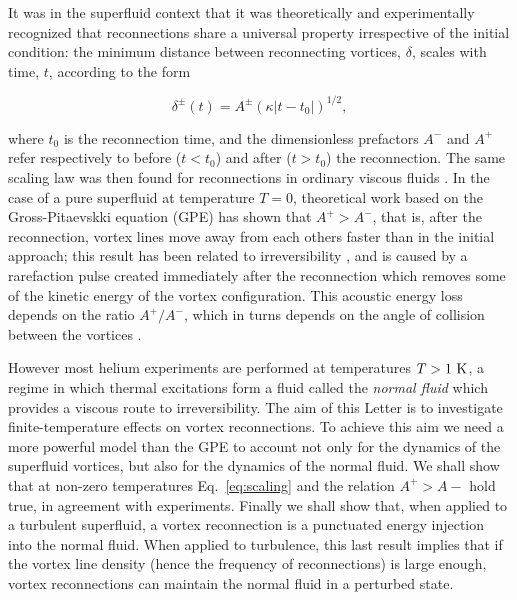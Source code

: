 \documentclass[%
 reprint,
 amsmath,amssymb,
 aps,
 prl,
]{revtex4-2}
\begin{document}
It was in the superfluid context that it was theoretically and
experimentally recognized
\cite{nazarenko2003,bewley2008,paoletti2010,zuccherQuantumVortexReconnections2012a,villoisUniversalNonuniversalAspects2017a,galantucciCrossoverInteractionDriven2019a}
that reconnections share a universal property irrespective of the initial
condition: the minimum distance between reconnecting 
vortices, $\delta$, scales with time, $t$, according to the form

\begin{equation}
\label{eq:scaling}
	\delta^{\pm}(t) = A^{\pm} (\kappa|t-t_0|)^{1/2},
\end{equation} 

\noindent
where $t_0$ is the reconnection time, and the dimensionless
prefactors $A^-$ and $A^+$ refer respectively to before
($t<t_0$) and after ($t>t_0$) the reconnection. The same scaling law
was then found for reconnections in ordinary viscous fluids 
\cite{yaoSeparationScalingViscous2020}. In the case of a pure
superfluid at temperature $T=0$, theoretical work based on
the Gross-Pitaevskki equation (GPE) has shown that
$A^+>A^-$, that is, after the reconnection, vortex lines move away from 
each others faster than in the initial approach; this result has been
related to irreversibility \cite{villoisIrreversibleDynamicsVortex2020},
and is caused by a rarefaction pulse created immediately after the reconnection\cite{leadbeaterSoundEmissionDue2001b,zuccherQuantumVortexReconnections2012a} which
removes some of the kinetic energy of the vortex configuration.
This acoustic energy loss depends on
the ratio $A^+/A^-$, which in turns depends on the angle of collision
between the vortices \cite{villoisIrreversibleDynamicsVortex2020}. 

However most helium experiments
are performed at temperatures $T>1~\rm K$, a regime in which thermal 
excitations form a fluid called the {\it normal fluid} which provides a viscous
route to irreversibility. The aim of this Letter is to investigate
finite-temperature effects on vortex reconnections. 
To achieve this aim we need a more powerful
model than the GPE to account not only for the dynamics of the
superfluid vortices, but also for the dynamics of the normal fluid.
We shall show that at non-zero temperatures Eq.~\ref{eq:scaling} and the
relation $A^+>A-$ hold true, in agreement with experiments. Finally we shall
show that, when applied to a turbulent superfluid, a vortex
reconnection is a punctuated energy injection into the normal fluid.
When applied to turbulence, this last result implies that if the vortex line 
density (hence the frequency of reconnections) is large enough, vortex
reconnections can maintain the normal fluid in a perturbed state.
\end{document}
